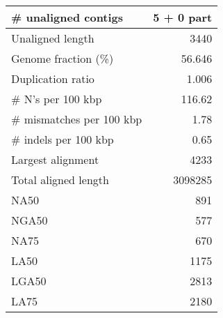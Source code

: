 \documentclass[12pt,a4paper]{article}
\begin{document}
\begin{table}[ht]
\begin{center}
\begin{tabular}{|l*{1}{|r}|}
\# unaligned contigs & 5 + 0 part \\ \hline
Unaligned length & 3440 \\ \hline
Genome fraction (\%) & 56.646 \\ \hline
Duplication ratio & 1.006 \\ \hline
\# N's per 100 kbp & 116.62 \\ \hline
\# mismatches per 100 kbp & 1.78 \\ \hline
\# indels per 100 kbp & 0.65 \\ \hline
Largest alignment & 4233 \\ \hline
Total aligned length & 3098285 \\ \hline
NA50 & 891 \\ \hline
NGA50 & 577 \\ \hline
NA75 & 670 \\ \hline
LA50 & 1175 \\ \hline
LGA50 & 2813 \\ \hline
LA75 & 2180 \\ \hline
\end{tabular}
\end{center}
\end{table}
\end{document}
